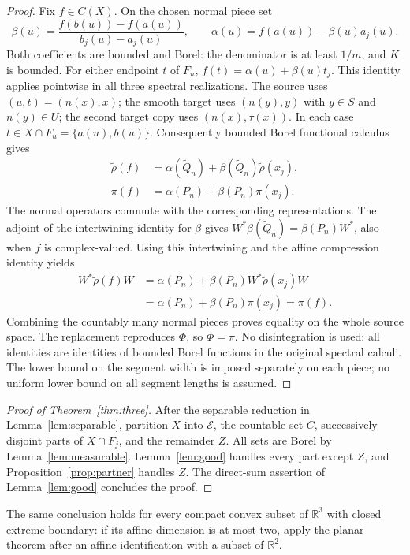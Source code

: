 \documentclass[11pt,letterpaper]{amsart}
\theoremstyle{definition}
\theoremstyle{remark}
\numberwithin{equation}{section}
\newcommand{\R}{\mathbb R}
\begin{document}
\begin{proof}
Fix $f\in C(X)$. On the chosen normal piece set
\[
 \beta(u)=\frac{f(b(u))-f(a(u))}{b_j(u)-a_j(u)},
 \qquad \alpha(u)=f(a(u))-\beta(u)a_j(u).
\]
Both coefficients are bounded and Borel: the denominator is at least
$1/m$, and $K$ is bounded. For either endpoint $t$ of $F_u$,
$f(t)=\alpha(u)+\beta(u)t_j$. This identity applies pointwise in all
three spectral realizations. The source uses $(u,t)=(n(x),x)$;
the smooth target uses $(n(y),y)$ with $y\in S$ and $n(y)\in U$;
the second target copy uses $(n(x),\tau(x))$. In each case
$t\in X\cap F_u=\{a(u),b(u)\}$.
Consequently bounded Borel functional calculus gives
\[
 \begin{split}
 \widetilde\rho(f)&=\alpha(\widetilde Q_n)
                  +\beta(\widetilde Q_n)\widetilde\rho(x_j),\\
 \pi(f)&=\alpha(P_n)+\beta(P_n)\pi(x_j).
 \end{split}
\]
The normal operators commute with the corresponding representations.
The adjoint of the intertwining identity for $\overline\beta$ gives
$W^*\beta(\widetilde Q_n)=\beta(P_n)W^*$, also when $f$ is complex-valued.
Using this intertwining and the affine compression identity yields
\[
 \begin{split}
 W^*\widetilde\rho(f)W
 &=\alpha(P_n)+\beta(P_n)W^*\widetilde\rho(x_j)W\\
 &=\alpha(P_n)+\beta(P_n)\pi(x_j)=\pi(f).
 \end{split}
\]
Combining the countably many normal pieces proves equality on the
whole source space. The replacement reproduces $\Phi$, so $\Phi=\pi$.
No disintegration is used: all identities are identities of bounded
Borel functions in the original spectral calculi. The lower bound
on the segment width is imposed separately on each piece; no uniform
lower bound on all segment lengths is assumed.
\end{proof}

\begin{proof}[Proof of Theorem~\ref{thm:three}]
After the separable reduction in Lemma~\ref{lem:separable}, partition
$X$ into $\mathcal E$, the countable set $C$, successively disjoint
parts of $X\cap F_j$, and the remainder $Z$. All sets are Borel by
Lemma~\ref{lem:measurable}. Lemma~\ref{lem:good} handles every part
except $Z$, and Proposition~\ref{prop:partner} handles $Z$.
The direct-sum assertion of Lemma~\ref{lem:good} concludes the proof.
\end{proof}

The same conclusion holds for every compact convex subset of $\R^3$
with closed extreme boundary: if
its affine dimension is at most two, apply the planar theorem after an
affine identification with a subset of $\R^2$.
\end{document}
